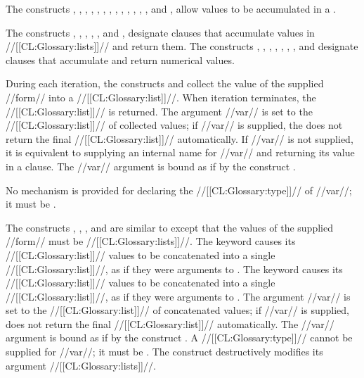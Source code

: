 \endsubsection%

 
 

The constructs , , , , , , , , , , , , , and , allow values to be accumulated in a .
 
 

  The constructs ,  , , ,  , and ,  designate clauses that accumulate values in //[[CL:Glossary:lists]]// and return them. The constructs , ,  , , , , , and  designate clauses that accumulate and return numerical values.

During each iteration,  the constructs  and  collect the value of the supplied //form// into a //[[CL:Glossary:list]]//.  When iteration terminates, the //[[CL:Glossary:list]]// is returned. The argument //var// is  set to the //[[CL:Glossary:list]]//  of collected values; if //var// is supplied, the  does not return the final //[[CL:Glossary:list]]// automatically.  If  //var// is not supplied, it is equivalent to supplying an internal name for //var// and returning its value in a  clause. The //var// argument is bound as if by the construct .

No mechanism is provided for declaring the //[[CL:Glossary:type]]// of //var//; it must be .
 

The constructs , ,  , and   are similar to  except that the values of the supplied //form// must be //[[CL:Glossary:lists]]//.  
  \beginlist \itemitem{\bull} The  keyword causes its //[[CL:Glossary:list]]// values to be concatenated  into a single //[[CL:Glossary:list]]//, as if  they were arguments to .
  \itemitem{\bull} The  keyword causes its //[[CL:Glossary:list]]// values to be concatenated into a single //[[CL:Glossary:list]]//, as if they were arguments to .   \endlist
  The argument //var// is  set to the //[[CL:Glossary:list]]// of  concatenated values; if //var// is supplied,   does not return the final //[[CL:Glossary:list]]// automatically.   The //var// argument is bound as if by the construct .
 A //[[CL:Glossary:type]]// cannot be supplied for //var//;  it must be .
 The construct   destructively modifies its argument //[[CL:Glossary:lists]]//.


